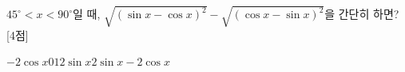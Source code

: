 $45^\circ<x<90^\circ$일 때, $\sqrt{(\sin x-\cos x)^2}-\sqrt{(\cos x-\sin x)^2}$을 간단히 하면? \mbox{[4점]}
\begin{choices32}{$-2\cos x$}{$0$}{$1$}{$2\sin x$}{$2\sin x-2\cos x$}\end{choices32}
